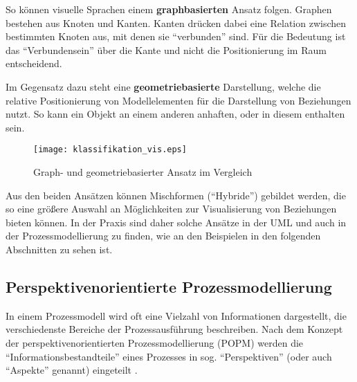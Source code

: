 \documentclass[a4paper,10pt]{sphinxmanual}
\begin{document}
So können visuelle Sprachen einem \textbf{graphbasierten} Ansatz folgen.
Graphen bestehen aus Knoten und Kanten. Kanten drücken dabei eine Relation zwischen bestimmten Knoten aus, mit denen sie "`verbunden"' sind.
Für die Bedeutung ist das "`Verbundensein"' über die Kante und nicht die Positionierung im Raum entscheidend.

Im Gegensatz dazu steht eine \textbf{geometriebasierte} Darstellung, welche die relative Positionierung von Modellelementen für die Darstellung von Beziehungen nutzt.
So kann ein Objekt an einem anderen anhaften, oder in diesem enthalten sein.
\begin{figure}[htbp]
\centering
\capstart

\texttt{[image: klassifikation\_vis.eps]}
\caption{Graph- und geometriebasierter Ansatz im Vergleich}\label{grundlagen:klassifikation-vis}\end{figure}

Aus den beiden Ansätzen können Mischformen ("`Hybride"') gebildet werden, die so eine größere Auswahl an Möglichkeiten zur Visualisierung von Beziehungen bieten können.
In der Praxis sind daher solche Ansätze in der UML \cite{booch_unified_1999} und auch in der Prozessmodellierung zu finden, wie an den Beispielen in den folgenden Abschnitten zu sehen ist.


\subsection{Perspektivenorientierte Prozessmodellierung}
\label{grundlagen:perspektivenorientierte-prozessmodellierung}\label{grundlagen:popm}
In einem Prozessmodell wird oft eine Vielzahl von Informationen dargestellt, die verschiedenste Bereiche der Prozessausführung beschreiben.
Nach dem Konzept der perspektivenorientierten Prozessmodellierung (POPM) werden die "`Informationsbestandteile"' eines Prozesses in sog. "`Perspektiven"' (oder auch "`Aspekte"' genannt) eingeteilt
\cite{jablonski_workflow_1996} \cite{jablonski_perspective_2008}.
\end{document}
